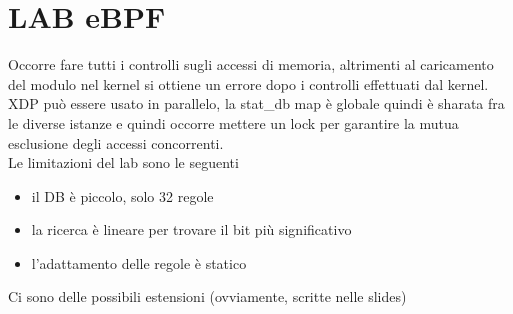 \documentclass[12pt, oneside]{extbook} %
\begin{document}
\section*{LAB eBPF}
Occorre fare tutti i controlli sugli accessi di memoria, altrimenti al caricamento del modulo nel kernel si ottiene un errore dopo i controlli effettuati dal kernel. XDP può essere usato in parallelo, la stat\_db map è globale quindi è sharata fra le diverse istanze e quindi occorre mettere un lock per garantire la mutua esclusione degli accessi concorrenti.\\ Le limitazioni del lab sono le seguenti
\begin{itemize}
\item il DB è piccolo, solo 32 regole
\item la ricerca è lineare per trovare il bit più significativo
\item l'adattamento delle regole è statico
\end{itemize}
Ci sono delle possibili estensioni (ovviamente, scritte nelle slides)
\end{document}
